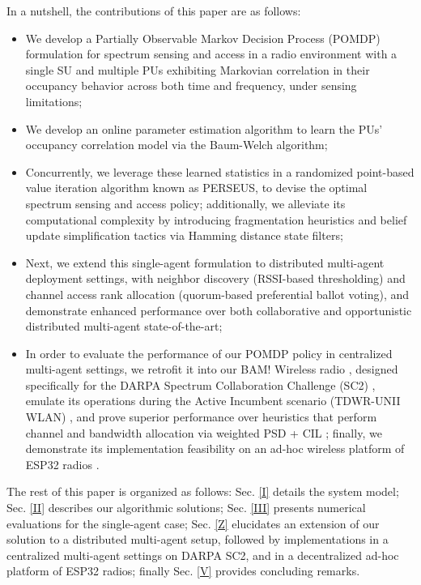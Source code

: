 \documentclass[10pt, twocolumn]{IEEEtran}
\begin{document}
 In a nutshell, the contributions of this paper are as follows:
\begin{itemize}
    \item We develop a 
     Partially Observable Markov Decision Process (POMDP) formulation for spectrum sensing and access in a radio environment with a single SU and multiple PUs exhibiting Markovian correlation in their occupancy behavior across both time and frequency, under sensing limitations;
    \item We develop an online parameter estimation algorithm to learn the PUs' occupancy correlation model via  the Baum-Welch algorithm;
    \item Concurrently, we leverage these learned statistics in a randomized point-based value iteration algorithm known as PERSEUS, to devise the optimal spectrum sensing and access policy; additionally, we alleviate its computational complexity by introducing fragmentation heuristics and belief update simplification tactics via Hamming distance state filters;
    \item Next, we extend this single-agent formulation to distributed multi-agent deployment settings, with neighbor discovery (RSSI-based thresholding) and channel access rank allocation (quorum-based preferential ballot voting), and demonstrate enhanced performance over both collaborative and opportunistic distributed multi-agent state-of-the-art;
    \item In order to evaluate the performance of our POMDP policy in centralized multi-agent settings, we retrofit it into our BAM! Wireless radio \cite{BAM}, designed specifically for the DARPA Spectrum Collaboration Challenge (SC2) \cite{DARPA:SC2, DARPA:SC2scenarios}, emulate its operations during the Active Incumbent scenario (TDWR-UNII WLAN) \cite{DARPA:ActiveIncumbent}, and prove superior performance over heuristics that perform channel and bandwidth allocation via weighted PSD + CIL  \cite{DARPA:CIL, DARPASC2:end1, 8935729, DARPASC2:end3, DARPASC2:end4}; 
    finally, we demonstrate its implementation feasibility on an ad-hoc wireless platform of ESP32 radios \cite{GCTronic:epuck2, Espressif:ESP32}.
\end{itemize}

The rest of this paper is organized as follows: Sec. \ref{I} details the system model; Sec. \ref{II} describes
our algorithmic solutions; Sec. \ref{III} presents numerical evaluations for the single-agent case; Sec. \ref{Z} elucidates an extension of our solution to a distributed multi-agent setup,
followed by implementations in a centralized multi-agent settings on DARPA SC2,
and in a decentralized ad-hoc platform of ESP32 radios;  finally Sec. \ref{V} provides concluding remarks.
\vspace{-7mm}
\end{document}
